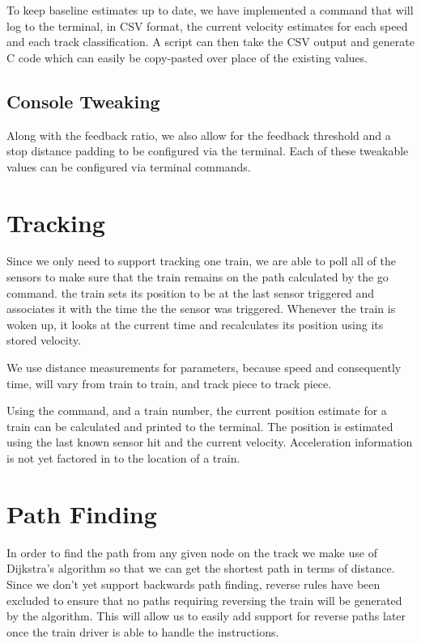 \documentclass[pdftex,10pt,a4paper]{article}
\begin{document}
To keep baseline estimates up to date, we have implemented a 
command that will log to the terminal, in CSV format, the current
velocity estimates for each speed and each track classification. A script
can then take the CSV output and generate C code which can easily be
copy-pasted over place of the existing values.

\subsection*{Console Tweaking}

Along with the feedback ratio, we also allow for the feedback threshold
and a stop distance padding to be configured via the terminal. Each of
these tweakable values can be configured via terminal commands.

\section*{Tracking}

Since we only need to support tracking one train, we are able to poll 
all of the sensors to make sure that the train remains on the path
calculated by the go command. the train sets its position to be at the
last sensor triggered and associates it with the time the the sensor was
triggered. Whenever the train is woken up, it looks at the
current time and recalculates its position using its stored velocity.

We use distance measurements for parameters, because speed and 
consequently time, will vary from train to train, and track piece to
track piece.

Using the  command, and a train number, the current position
estimate for a train can be calculated and printed to the terminal. The
position is estimated using the last known sensor hit and the current
velocity. Acceleration information is not yet factored in to the
location of a train.

\section*{Path Finding}

In order to find the path from any given node on the track we make use of
Dijkstra's algorithm so that we can get the shortest path in terms of distance.
Since we don't yet support backwards path finding, reverse rules have been excluded to
ensure that no paths requiring reversing the train will be generated by the algorithm. This will
allow us to easily add support for reverse paths later once the train driver
is able to handle the instructions.
\end{document}
